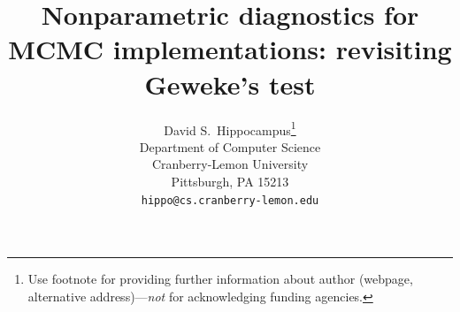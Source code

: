 \documentclass{article}
\title{
    Nonparametric diagnostics for MCMC implementations: revisiting Geweke's test
}
\author{%
  David S.~Hippocampus\thanks{Use footnote for providing further information
    about author (webpage, alternative address)---\emph{not} for acknowledging
    funding agencies.} \\
  Department of Computer Science\\
  Cranberry-Lemon University\\
  Pittsburgh, PA 15213 \\
  \texttt{hippo@cs.cranberry-lemon.edu} \\
}
\begin{document}
\maketitle

\end{document}
